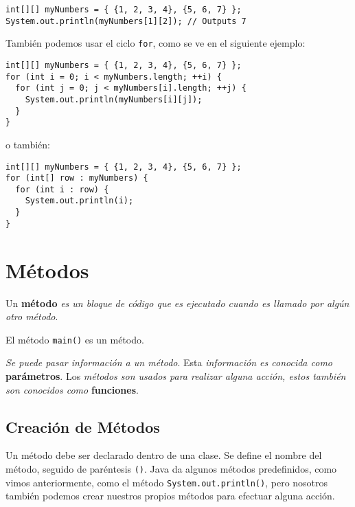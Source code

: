\documentclass[12pt]{article}
\newcounter{it}
\theoremstyle{largebreak}
\begin{document}
    \begin{lstlisting}[caption={Acceder Elementos de Arreglo Bidimensional.},label=DescriptiveLabel]
int[][] myNumbers = { {1, 2, 3, 4}, {5, 6, 7} };
System.out.println(myNumbers[1][2]); // Outputs 7
    \end{lstlisting}

    \begin{obs}
        También podemos usar el ciclo \lstinline|for|, como se ve en el siguiente ejemplo:
        \begin{lstlisting}[caption={Ciclo \lstinline|for| en Arreglo Bidimensional.},label=DescriptiveLabel]
int[][] myNumbers = { {1, 2, 3, 4}, {5, 6, 7} };
for (int i = 0; i < myNumbers.length; ++i) {
  for (int j = 0; j < myNumbers[i].length; ++j) {
    System.out.println(myNumbers[i][j]);
  }
}
        \end{lstlisting}
        o también:
        \begin{lstlisting}[caption={Ciclo \lstinline|for-each| en Arreglo Bidimensional.},label=DescriptiveLabel]
int[][] myNumbers = { {1, 2, 3, 4}, {5, 6, 7} };
for (int[] row : myNumbers) {
  for (int i : row) {
    System.out.println(i);
  }
}
        \end{lstlisting}
    \end{obs}

    \section{Métodos}

    \begin{mydef}
        Un \textbf{método} \textit{es un bloque de código que es ejecutado cuando es llamado por algún otro método}.
    \end{mydef}

    \begin{obs}
        El método \lstinline|main()| es un método.
    \end{obs}

    \textit{Se puede pasar información a un método}. Esta \textit{información es conocida como} \textbf{parámetros}. Los \textit{métodos son usados para realizar alguna acción, estos también son conocidos como} \textbf{funciones}.

    \subsection{Creación de Métodos}
    
    Un método debe ser declarado dentro de una clase. Se define el nombre del método, seguido de paréntesis \lstinline|()|. Java da algunos métodos predefinidos, como vimos anteriormente, como el método \lstinline|System.out.println()|, pero nosotros también podemos crear nuestros propios métodos para efectuar alguna acción.
\end{document}
